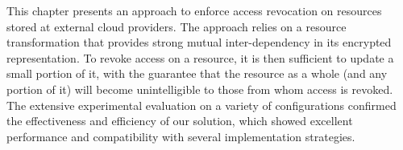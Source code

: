 This chapter presents an approach to enforce access revocation on resources stored at external cloud providers.
%
The approach relies on a resource transformation that provides strong mutual inter-dependency in its encrypted representation.
%
To revoke access on a resource, it is then sufficient to update a small portion of it, with the guarantee that the resource as a whole (and any portion of it) will become unintelligible to those from whom access is revoked.
%
The extensive experimental evaluation on a variety of configurations confirmed the effectiveness and efficiency of our solution, which showed excellent performance and compatibility with several implementation strategies.